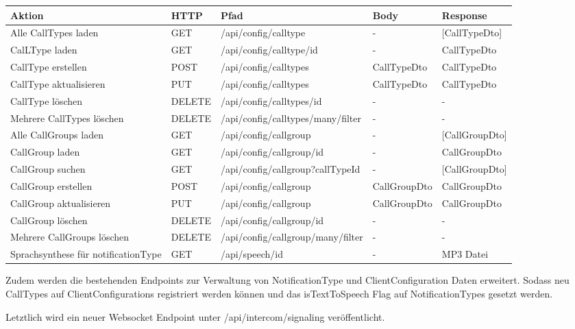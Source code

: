 \begin{tabularx}{\textwidth}{|p{3cm}|l|l|X|X|}
    \hline
    \textbf{Aktion}                & \textbf{HTTP} & \textbf{Pfad}             & \textbf{Body}   & \textbf{Response} \\
    \hline
    Alle CallTypes laden    & GET          & /api/config/calltype       & - & [CallTypeDto]                 \\
    \hline
    CalLType laden        & GET        & /api/config/calltype/id       & -        & CallTypeDto                 \\
    \hline
    CallType erstellen & POST          & /api/config/calltypes & CallTypeDto & CallTypeDto \\
    \hline
    CallType aktualisieren & PUT          & /api/config/calltypes & CallTypeDto & CallTypeDto \\
    \hline
    CallType löschen & DELETE          & /api/config/calltypes/id & - & - \\
    \hline
    Mehrere CallTypes löschen & DELETE          & /api/config/calltypes/many/filter & - & - \\
    \hline
    Alle CallGroups laden    & GET          & /api/config/callgroup       & - & [CallGroupDto]                 \\
    \hline
    CallGroup laden        & GET        & /api/config/callgroup/id       & -        & CallGroupDto                 \\
    \hline
    CallGroup suchen        & GET        & /api/config/callgroup?callTypeId       & -        & [CallGroupDto]                 \\
    \hline
    CallGroup erstellen & POST          & /api/config/callgroup & CallGroupDto & CallGroupDto \\
    \hline
    CallGroup aktualisieren & PUT          & /api/config/callgroup & CallGroupDto & CallGroupDto \\
    \hline
    CallGroup löschen & DELETE          & /api/config/callgroup/id & - & - \\
    \hline
    Mehrere CallGroups löschen & DELETE          & /api/config/callgroup/many/filter & - & - \\
    \hline
    Sprachsynthese für notificationType        & GET        & /api/speech/id       & -        & MP3 Datei                 \\
    \hline
\end{tabularx}\label{tab:new-api-methods}

Zudem werden die bestehenden Endpoints zur Verwaltung von NotificationType und ClientConfiguration Daten erweitert.
Sodass neu CallTypes auf ClientConfigurations registriert werden können und das isTextToSpeech Flag auf NotificationTypes
gesetzt werden.

Letztlich wird ein neuer Websocket Endpoint unter /api/intercom/signaling veröffentlicht.

\clearpage
